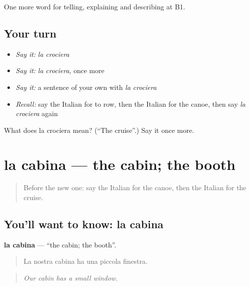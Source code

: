 \begin{grammarlens}[title={What you've built}]
One more word for telling, explaining and describing at B1.
\end{grammarlens}

\subsection*{Your turn}
\begin{itemize}
\raggedright
  \item \emph{Say it:} \emph{la crociera}
  \item \emph{Say it:} \emph{la crociera}, once more
  \item \emph{Say it:} a sentence of your own with \emph{la crociera}
  \item \emph{Recall:} say the Italian for to row, then the Italian for the canoe, then say \emph{la crociera} again
\end{itemize}

\begin{tcolorbox}[breakable,colback=teal!4,colframe=teal!35!black,title={Before you move on}]
What does la crociera mean? (\textquotedblleft{}The cruise\textquotedblright{}.) Say it once more.
\end{tcolorbox}
\section[la cabina]{la cabina — the cabin; the booth}

\label{lesson:IT-C423-cabina}



\begin{quote}
Before the new one: say the Italian for the canoe, then the Italian for the cruise.
\end{quote}

\subsection*{You'll want to know: la cabina}
\textbf{la cabina} — \textquotedblleft{}the cabin; the booth\textquotedblright{}.

\begin{quote}
La nostra cabina ha una piccola finestra.
\end{quote}

\begin{quote}
\emph{Our cabin has a small window.}
\end{quote}

